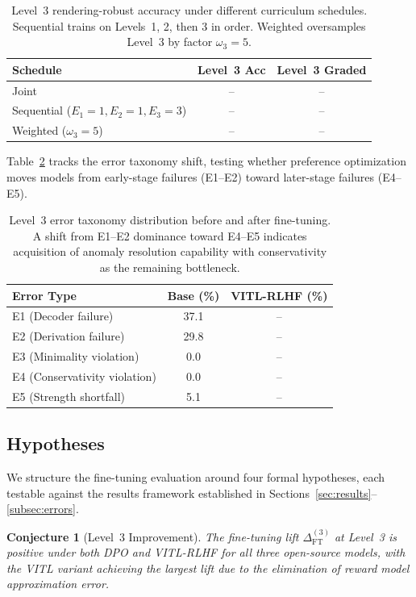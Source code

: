 \documentclass{article}
\newtheorem{conjecture}[theorem]{Conjecture}
\theoremstyle{definition}
\begin{document}
\begin{table}[t]
\centering
\caption{Level~3 rendering-robust accuracy under different curriculum schedules. Sequential trains on Levels~1, 2, then 3 in order. Weighted oversamples Level~3 by factor $\omega_3 = 5$.}
\label{tab:ft_curriculum}
\small
\begin{tabular}{@{}lcc@{}}
\toprule
Schedule & Level~3 Acc & Level~3 Graded \\
\midrule
Joint & -- & -- \\
Sequential ($E_1{=}1, E_2{=}1, E_3{=}3$) & -- & -- \\
Weighted ($\omega_3 = 5$) & -- & -- \\
\bottomrule
\end{tabular}
\end{table}

Table~\ref{tab:ft_errors} tracks the error taxonomy shift, testing whether preference optimization moves models from early-stage failures (E1--E2) toward later-stage failures (E4--E5).

\begin{table}[t]
\centering
\caption{Level~3 error taxonomy distribution before and after fine-tuning. A shift from E1--E2 dominance toward E4--E5 indicates acquisition of anomaly resolution capability with conservativity as the remaining bottleneck.}
\label{tab:ft_errors}
\small
\begin{tabular}{@{}lcc@{}}
\toprule
Error Type & Base (\%) & VITL-RLHF (\%) \\
\midrule
E1 (Decoder failure) & 37.1 & -- \\
E2 (Derivation failure) & 29.8 & -- \\
E3 (Minimality violation) & 0.0 & -- \\
E4 (Conservativity violation) & 0.0 & -- \\
E5 (Strength shortfall) & 5.1 & -- \\
\bottomrule
\end{tabular}
\end{table}


\subsection{Hypotheses}\label{subsec:ft_hypotheses}

We structure the fine-tuning evaluation around four formal hypotheses, each testable against the results framework established in Sections~\ref{sec:results}--\ref{subsec:errors}.

\begin{conjecture}[Level~3 Improvement]\label{conj:l3improve}
The fine-tuning lift $\Delta_{\mathrm{FT}}^{(3)}$ at Level~3 is positive under both DPO and VITL-RLHF for all three open-source models, with the VITL variant achieving the largest lift due to the elimination of reward model approximation error.
\end{conjecture}
\end{document}
